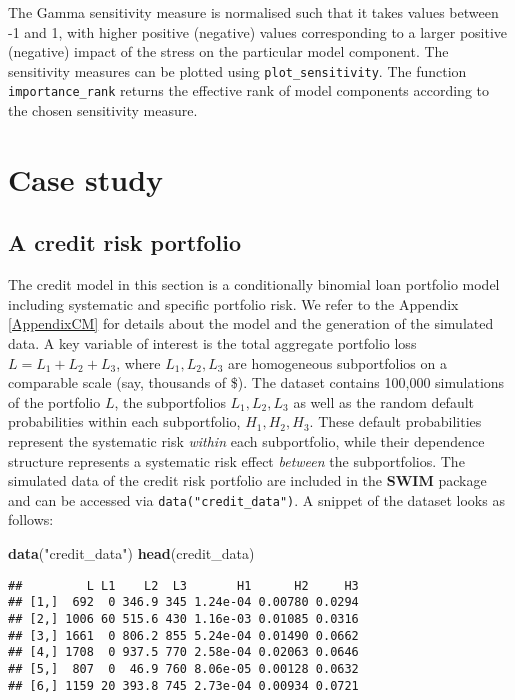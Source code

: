 \documentclass[
]{article}
\newenvironment{Shaded}{\begin{snugshade}}{\end{snugshade}}
\newcommand{\KeywordTok}[1]{\textcolor[rgb]{0.13,0.29,0.53}{\textbf{#1}}}
\newcommand{\NormalTok}[1]{#1}
\newcommand{\StringTok}[1]{\textcolor[rgb]{0.31,0.60,0.02}{#1}}
\begin{document}
The Gamma sensitivity measure is normalised such that it takes values between -1 and 1, with higher positive (negative) values corresponding to a larger positive (negative) impact of the stress on the particular model component. The sensitivity measures can be plotted using \texttt{plot\_sensitivity}. The function \texttt{importance\_rank} returns the effective rank of model components according to the chosen sensitivity measure.

\hypertarget{Sec:CreditModel}{%
\section{Case study}\label{Sec:CreditModel}}

\hypertarget{a-credit-risk-portfolio}{%
\subsection{A credit risk portfolio}\label{a-credit-risk-portfolio}}

The credit model in this section is a conditionally binomial loan portfolio model including systematic and specific portfolio risk. We refer to the Appendix \ref{AppendixCM} for details about the model and the generation of the simulated data. A key variable of interest is the total aggregate portfolio loss \(L = L_1 + L_2 + L_3\), where \(L_1, L_2, L_3\) are homogeneous subportfolios on a comparable scale (say, thousands of \$). The dataset contains 100,000 simulations of the portfolio \(L\), the subportfolios \(L_1, L_2, L_3\) as well as the random default probabilities within each subportfolio, \(H_1, H_2, H_3\). These default probabilities represent the systematic risk \emph{within} each subportfolio, while their dependence structure represents a systematic risk effect \emph{between} the subportfolios. The simulated data of the credit risk portfolio are included in the \textbf{SWIM} package and can be accessed via \texttt{data("credit\_data")}. A snippet of the dataset looks as follows:

\begin{Shaded}
\begin{Highlighting}[]
\KeywordTok{data}\NormalTok{(}\StringTok{"credit_data"}\NormalTok{)}
\KeywordTok{head}\NormalTok{(credit_data)}
\end{Highlighting}
\end{Shaded}

\begin{verbatim}
##         L L1    L2  L3       H1      H2     H3
## [1,]  692  0 346.9 345 1.24e-04 0.00780 0.0294
## [2,] 1006 60 515.6 430 1.16e-03 0.01085 0.0316
## [3,] 1661  0 806.2 855 5.24e-04 0.01490 0.0662
## [4,] 1708  0 937.5 770 2.58e-04 0.02063 0.0646
## [5,]  807  0  46.9 760 8.06e-05 0.00128 0.0632
## [6,] 1159 20 393.8 745 2.73e-04 0.00934 0.0721
\end{verbatim}
\end{document}
